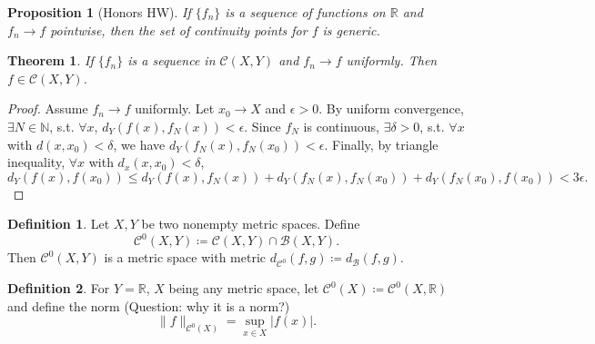 \documentclass[12pt]{article}
\theoremstyle{plain}
\newtheorem{thm}{Theorem}
\newtheorem*{prop}{Proposition}
\theoremstyle{definition}
\newtheorem*{defn}{Definition}
\begin{document}
\begin{prop}[Honors HW]
    If $\{f_n\}$ is a sequence of functions on $\mathbb{R}$ and $f_n\rightarrow
    f$ pointwise, then the set of continuity points for $f$ is generic.
\end{prop}

\begin{thm}
    If $\{f_n\}$ is a sequence in $\mathcal{C}(X,Y)$ and $f_n\rightarrow f$
    uniformly. Then $f\in\mathcal{C}(X,Y)$.
\end{thm}
\begin{proof}
    Assume $f_n\rightarrow f$ uniformly.
    Let $x_0\rightarrow X$ and $\epsilon>0$.
    By uniform convergence, $\exists N\in\mathbb{N}$, s.t.
    $\forall x$, $d_Y(f(x),f_N(x))<\epsilon$.
    Since $f_N$ is continuous, $\exists\delta>0$, s.t. $\forall x$ with
    $d(x,x_0)<\delta$, we have $d_Y(f_N(x),f_N(x_0))<\epsilon$.
    Finally, by triangle inequality, $\forall x$ with $d_x(x,x_0)<\delta$,
    $$d_Y(f(x),f(x_0))\leq
    d_Y(f(x),f_N(x))+d_Y(f_N(x),f_N(x_0))+d_Y(f_N(x_0),f(x_0))<3\epsilon.$$
\end{proof}

\begin{defn}
    Let $X,Y$ be two nonempty metric spaces.
    Define
    $$\mathcal{C}^0(X,Y)\coloneqq\mathcal{C}(X,Y)\cap\mathcal{B}(X,Y).$$
    Then $\mathcal{C}^0(X,Y)$ is a metric space with metric
    $d_{\mathcal{C}^0}(f,g)\coloneqq d_{\mathcal{B}}(f,g)$.
\end{defn}
\begin{defn}
    For $Y=\mathbb{R}$, $X$ being any metric space, let
    $\mathcal{C}^0(X)\coloneqq\mathcal{C}^0(X,\mathbb{R})$ and define the norm
    (Question: why it is a norm?)
    $$\|f\|_{\mathcal{C}^0(X)}=\sup_{x\in X}|f(x)|.$$
\end{defn}
\end{document}
